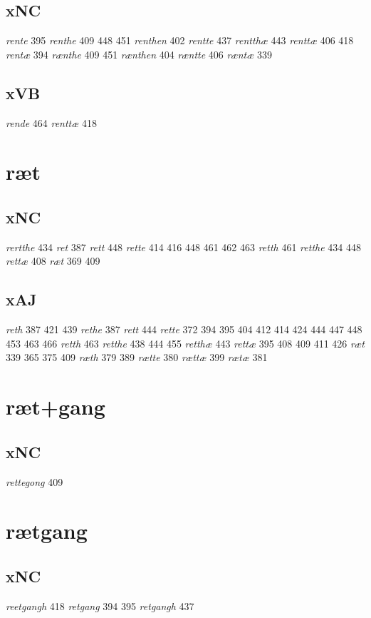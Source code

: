 \documentclass[a4paper,twocolumn]{article}
\begin{document}
\subsection{xNC}
\label{sec:org5109d1d}
\emph{rente} 395 \emph{renthe} 409 448 451 \emph{renthen} 402 \emph{rentte} 437 \emph{rentthæ} 443 \emph{renttæ} 406 418 \emph{rentæ} 394 \emph{rænthe} 409 451 \emph{rænthen} 404 \emph{ræntte} 406 \emph{ræntæ} 339 
\subsection{xVB}
\label{sec:orgbe1e766}
\emph{rende} 464 \emph{renttæ} 418 
\section{ræt}
\label{sec:orga50c5d3}
\subsection{xNC}
\label{sec:org5f78da1}
\emph{rertthe} 434 \emph{ret} 387 \emph{rett} 448 \emph{rette} 414 416 448 461 462 463 \emph{retth} 461 \emph{retthe} 434 448 \emph{rettæ} 408 \emph{ræt} 369 409 
\subsection{xAJ}
\label{sec:org8211284}
\emph{reth} 387 421 439 \emph{rethe} 387 \emph{rett} 444 \emph{rette} 372 394 395 404 412 414 424 444 447 448 453 463 466 \emph{retth} 463 \emph{retthe} 438 444 455 \emph{retthæ} 443 \emph{rettæ} 395 408 409 411 426 \emph{ræt} 339 365 375 409 \emph{ræth} 379 389 \emph{rætte} 380 \emph{rættæ} 399 \emph{rætæ} 381 
\section{ræt+gang}
\label{sec:org2c7dae8}
\subsection{xNC}
\label{sec:orgb3e1181}
\emph{rettegong} 409 
\section{rætgang}
\label{sec:orge868f29}
\subsection{xNC}
\label{sec:org9d8b4fc}
\emph{reetgangh} 418 \emph{retgang} 394 395 \emph{retgangh} 437 
\end{document}
